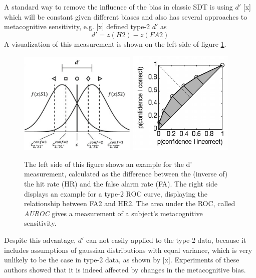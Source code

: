 \documentclass[../main/main.tex]{subfiles}
\begin{document}
	A standard way to remove the influence of the bias in classic SDT is using $d'$ [x] which will be constant given different biases and also has several approaches to metacognitive sensitivity, e.g. [x] defined type-2 $d'$ as
	\begin{displaymath}
		d' = z(H2) - z(FA2)
	\end{displaymath}
	A visualization of this measurement is shown on the left side of figure \ref{fig:d_dash_and_roc}.
	\begin{figure}[h]
		\centering
		\captionsetup{justification=centering}
		\includegraphics[width=0.5\textwidth]{../assets/d_dash.png}
		\includegraphics[width=0.45\textwidth]{../assets/type1_roc.png}
		\caption{The left side of this figure shows an example for the d' measurement, calculated as the difference between the (inverse of) the hit rate (HR) and the false alarm rate (FA). The right side displays an example for a type-2 ROC curve, displaying the relationship between FA2 and HR2. The area under the ROC, called \textit{AUROC} gives a measurement of a subject's metacognitive sensitivity.} 
		\label{fig:d_dash_and_roc}
	\end{figure}
	Despite this advantage, $d'$ can not easily applied to the type-2 data, because it includes assumptions of gaussian distributions with equal variance, which is very unlikely to be the case in type-2 data, as shown by [x]. Experiments of these authors showed that it is indeed affected by changes in the metacognitive bias.\\
\end{document}
